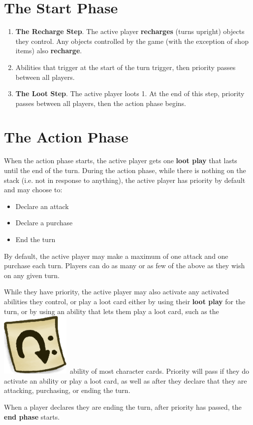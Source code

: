 \documentclass[a4paper, twoside]{report} %
\newcommand{\tap}{\includegraphics[scale=0.1]{./assets/Tag_Tap.png}}
\begin{document}
    \section{The Start Phase}
    \begin{enumerate}
        \item \textbf{The Recharge Step}. The active player \textbf{recharges} (turns upright) objects they control. Any objects controlled by the game (with the exception of shop items) also \textbf{recharge}.
        \item Abilities that trigger at the start of the turn trigger, then priority passes between all players.
        \item \textbf{The Loot Step}. The active player loots 1. At the end of this step, priority passes between all players, then the action phase begins.
    \end{enumerate}

    \section{The Action Phase}
    When the action phase starts, the active player gets one \textbf{loot play} that lasts until the end of the turn. During the action phase, while there is nothing on the stack (i.e. not in response to anything), the active player has priority by default and may choose to:
    \begin{itemize}
        \item Declare an attack
        \item Declare a purchase
        \item End the turn
    \end{itemize}
    By default, the active player may make a maximum of one attack and one purchase each turn.  Players can do as many or as few of the above as they wish on any given turn.

    While they have priority, the active player may also activate any activated abilities they control, or play a loot card either by using their \textbf{loot play} for the turn, or by using an ability that lets them play a loot card, such as the \tap\ ability of most character cards. Priority will pass if they do activate an ability or play a loot card, as well as after they declare that they are attacking, purchasing, or ending the turn.

    When a player declares they are ending the turn, after priority has passed, the \textbf{end phase} starts.
\end{document}
